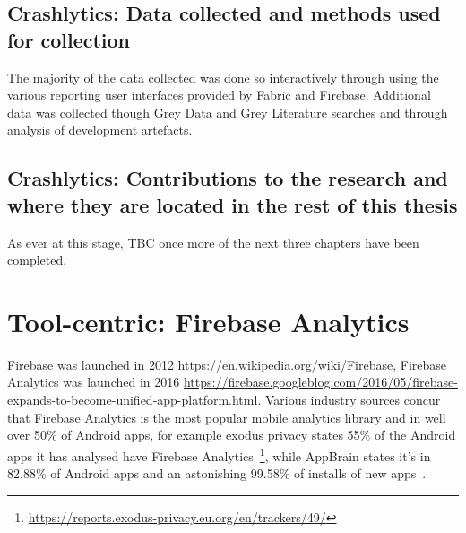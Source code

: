\subsection{Crashlytics: Data collected and methods used for collection}
The majority of the data collected was done so interactively through using the various reporting user interfaces provided by Fabric and Firebase. Additional data was collected though Grey Data and Grey Literature searches and through analysis of development artefacts.

\subsection{Crashlytics: Contributions to the research and where they are located in the rest of this thesis}
As ever at this stage, TBC once more of the next three chapters have been completed.


\clearpage

\section{Tool-centric: Firebase Analytics} 
Firebase was launched in 2012 \url{https://en.wikipedia.org/wiki/Firebase}, Firebase Analytics was launched in 2016 \url{https://firebase.googleblog.com/2016/05/firebase-expands-to-become-unified-app-platform.html}. Various industry sources concur that Firebase Analytics is the most popular mobile analytics library and in well over 50\% of Android apps, for example exodus privacy states 55\% of the Android apps it has analysed have Firebase Analytics~\footnote{\url{https://reports.exodus-privacy.eu.org/en/trackers/49/}}, while AppBrain states it's in 82.88\% of Android apps and an astonishing 99.58\% of installs of new apps~\citep{appbrain2021_firebase}. 

